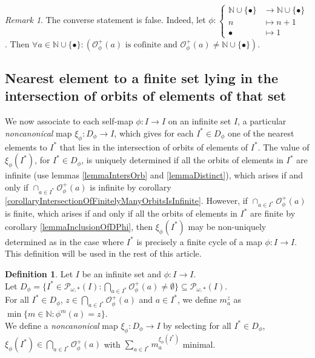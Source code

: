 \documentclass[a4paper,11pt]{article}
\theoremstyle{plain}
\theoremstyle{definition}
\newtheorem{definition}{Definition}[section]
\theoremstyle{remark}
\newtheorem{remark}{Remark}[section]
\begin{document}
\begin{remark}
The converse statement is false. Indeed, let $\phi : \begin{cases} \mathbb{N} \cup \{\bullet\} &\to \mathbb{N} \cup \{\bullet\} \\ n &\mapsto n+1 \\ \bullet &\mapsto 1 \end{cases}$. 
Then $\forall a \in \mathbb{N} \cup \{\bullet\} : (\mathcal{O}^{+}_\phi(a) \text{ is cofinite and } \mathcal{O}^{+}_\phi(a) \neq \mathbb{N} \cup \{\bullet\})$.
\end{remark}

\subsection{Nearest element to a finite set lying in the intersection of orbits of elements of that set}

We now associate to each self-map $\phi : I \to I$ on an infinite set $I$, a particular \textit{noncanonical} map $\xi_\phi : D_\phi \to I$, which gives for each $I^* \in D_\phi$ one of the nearest elements to $I^*$ that lies in the intersection of orbits of elements of $I^*$. The value of $\xi_\phi(I^*)$, for $I^* \in D_\phi$, is uniquely determined if all the orbits of elements in $I^*$ are infinite (use lemmas \ref{lemmaIntersOrb} and \ref{lemmaDistinct}), which arises if and only if $\cap_{a \in I^*} \mathcal{O}^{+}_\phi(a)$ is infinite by corollary \ref{corollaryIntersectionOfFinitelyManyOrbitsIsInfinite}. However, if $\cap_{a \in I^*} \mathcal{O}^{+}_\phi(a)$ is finite, which arises if and only if all the orbits of elements in $I^*$ are finite by corollary \ref{lemmaInclusionOfDPhi}, then $\xi_\phi(I^*)$ may be non-uniquely determined as in the case where $I^*$ is precisely a finite cycle of a map $\phi : I \to I$. This definition will be used in the rest of this article.

\begin{definition}
\label{defXi}
Let $I$ be an infinite set and $\phi : I \to I$. \\
Let $D_\phi = \{I^* \in \mathcal{P}_{\omega,*}(I) : \bigcap_{a \in I^*} \mathcal{O}^{+}_\phi(a) \neq \emptyset \} \subseteq \mathcal{P}_{\omega,*}(I)$. \\
For all $I^* \in D_\phi$, $z \in \bigcap_{a \in I^*} \mathcal{O}^{+}_\phi(a)$ and $a \in I^*$, we define $m^z_a$ as $\min\{m \in \mathbb{N} : \phi^m(a) = z\}$. \\
We define a \textit{noncanonical} map $\xi_\phi : D_\phi \to I$ by selecting for all $I^* \in D_\phi$, $\xi_\phi(I^*) \in \bigcap_{a \in I^*} \mathcal{O}^{+}_\phi(a)$ with $\sum_{a \in I^*} m^{\xi_\phi(I^*)}_a$ minimal.
\end{definition}
\end{document}
